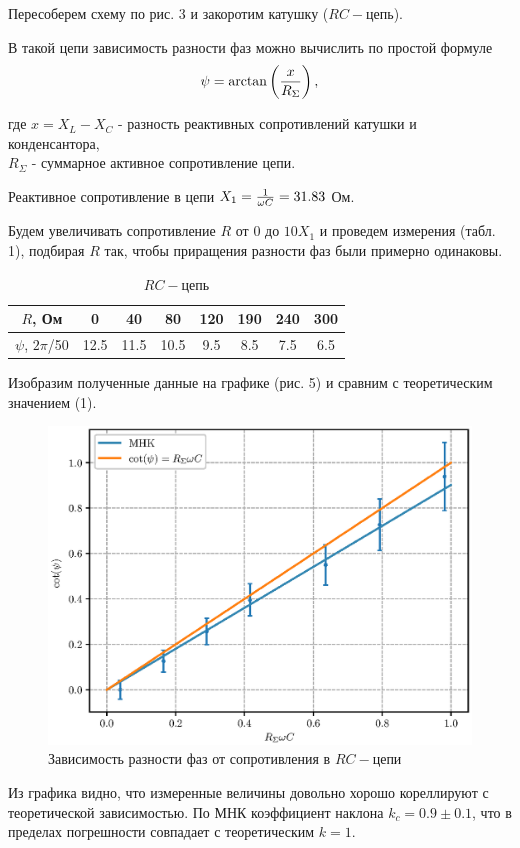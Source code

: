\documentclass[12pt,a4paper]{article}
\begin{document}
Пересоберем схему по рис. 3 и закоротим катушку ($RC-$цепь).

В такой цепи зависимость разности фаз можно вычислить по простой формуле 
\begin{equation}
    \psi = \arctan\left({x \over R_\Sigma}\right),
\end{equation}

где $x = X_L - X_C$ - разность реактивных сопротивлений катушки и конденсантора, \\$R_\Sigma$ - суммарное активное сопротивление цепи.

Реактивное сопротивление в цепи $X_1 = {1\over \omega C} = 31.83$ Ом.

Будем увеличивать сопротивление $R$ от 0 до $10X_1$ и проведем измерения (табл. 1), подбирая $R$ так, чтобы приращения разности фаз были примерно одинаковы.
\begin{table}[H]
    \centering
    \begin{tabular}{|c|c|c|c|c|c|c|c|}
        \hline
        $R$, Ом &0&40&80&120&190&240&300\\
        \hline
        $\psi$, $2\pi$/50 & 12.5 & 11.5&10.5&9.5&8.5&7.5&6.5\\
        \hline
    \end{tabular}
    \caption{$RC - $цепь}
\end{table}

Изобразим полученные данные на графике (рис. 5) и сравним с теоретическим значением (1).

\begin{figure}[h]
    \centering
    \includegraphics[width=0.6\linewidth]{pics/RC.eps}
    \caption{Зависимость разности фаз от сопротивления в $RC-$цепи}
\end{figure}

Из графика видно, что измеренные величины довольно хорошо кореллируют с теоретической зависимостью.
По МНК коэффициент наклона $k_c = 0.9 \pm 0.1$, что в пределах погрешности совпадает с теоретическим $k = 1$.
\newpage
\end{document}
